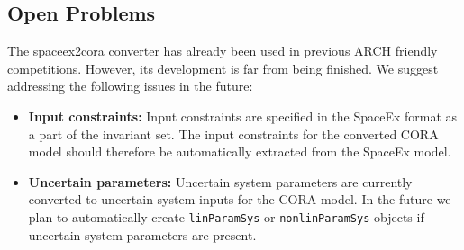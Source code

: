 

\subsection{Open Problems}

The spaceex2cora converter has already been used in previous ARCH friendly competitions. However, its development is far from being finished. We suggest addressing the following issues in the future:
\begin{itemize}
   \item \textbf{Input constraints:} Input constraints are specified in the SpaceEx format as a part of the invariant set. The input constraints for the converted CORA model should therefore be automatically extracted from the SpaceEx model.
   \item \textbf{Uncertain parameters:} Uncertain system parameters are currently converted to uncertain system inputs for the CORA model. In the future we plan to automatically create \texttt{linParamSys} or \texttt{nonlinParamSys} objects if uncertain system parameters are present.
\end{itemize}
